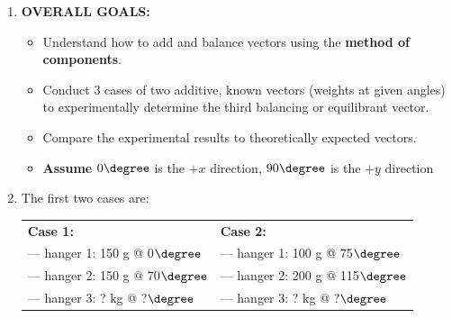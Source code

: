 \begin{enumerate}
\item \textbf{OVERALL GOALS:} 
\begin{itemize}
    \item Understand how to add and balance vectors using the \textbf{method of components}.
    \item Conduct 3 cases of two additive, known vectors (weights at given angles) to experimentally determine the third balancing or equilibrant vector.
    \item Compare the experimental results to theoretically expected vectors.
    \item \textbf{Assume} $0\degree$ is the $+x$ direction, $90 \degree$ is the $+y$ direction
\end{itemize}

\pagebreak

\item The first two cases are:

    \begin{tabular}{l|l}
    \textbf{Case 1:}     &  \hspace{20mm} \textbf{Case 2:} \\
    --- hanger 1: 150 g @ 0$\degree$    \hspace{20mm} & \hspace{20mm} --- hanger 1: 100 g @ 75$\degree$ \\
    --- hanger 2: 150 g @ 70$\degree$     & \hspace{20mm} --- hanger 2: 200 g @ 115$\degree$ \\
    --- hanger 3: ? kg @ ?$\degree$     & \hspace{20mm} --- hanger 3: ? kg @ ?$\degree$
    \end{tabular}


\end{enumerate}
